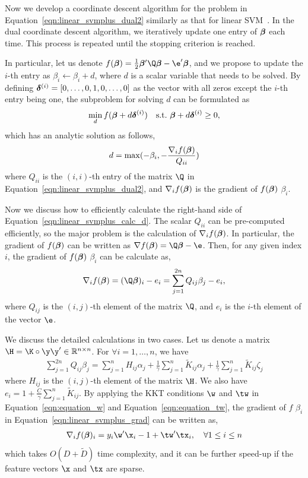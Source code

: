 Now we develop a coordinate descent algorithm for the problem in Equation~\ref{eqn:linear_svmplus_dual2} similarly as that for linear SVM~\citep{DCD_linearsvm}. In the dual coordinate descent algorithm, we iteratively update one entry of $\bm{\beta}$ each time. This process is repeated until the stopping criterion is reached.

In particular, let us denote $f(\bb) = \frac{1}{2}\bb'\Q\bb -\e'\bb$, and we propose to update the $i$-th entry as $\beta_i\leftarrow \beta_i + d$, where $d$ is a scalar variable that needs to be solved. By defining $\bm{\delta}^{(i)} = [0, \ldots, 0, 1, 0, \ldots, 0]$ as the vector with all zeros except the $i$-th entry being one, the subproblem for solving $d$ can be formulated as
\begin{eqnarray}
\min_{d} f(\bm{\beta} + d\bm{\delta}^{(i)}) \quad \mbox{s.t.}\,\,\bm{\beta} +  d\bm{\delta}^{(i)} \geq 0,\label{eqn:linear_svmplus_sub}
\end{eqnarray}
which has an analytic solution as follows,
\begin{eqnarray}
d = \max(- \beta_i, - \frac{\nabla_i f(\bm{\beta})}{Q_{ii}}) \label{eqn:linear_svmplus_calc_d}
\end{eqnarray}
where $Q_{ii}$ is the $(i, i)$-th entry of the matrix $\Q$ in Equation~\ref{eqn:linear_svmplus_dual2}, and $\nabla_if(\bm{\beta})$ is the gradient of $f(\bm{\beta})$ \wrt $\beta_i$.

Now we discuss how to efficiently calculate the right-hand side of Equation~\ref{eqn:linear_svmplus_calc_d}. The scalar $Q_{ii}$ can be pre-computed efficiently, so the major problem is the calculation of $\nabla_i f(\bm{\beta})$. In particular, the gradient of $f(\bm{\beta})$ can be written as $\nabla f(\bb) = \Q\bb - \e$. Then, for any given index $i$, the gradient of $f(\bm{\beta})$ \wrt $\beta_i$ can be calculate as,
\begin{eqnarray}\label{eqn:linear_svmplus_grad}
\nabla_if(\bb) = (\Q\bb)_i - e_i = \sum_{j=1}^{2n}Q_{ij}\beta_j - e_i,
\end{eqnarray}
where $Q_{ij}$ is the $(i, j)$-th element of the matrix $\Q$, and $e_i$ is the $i$-th element of the vector $\e$.

We discuss the detailed calculations in two cases. Let us denote a matrix $\H = \K\circ\y\y' \in \bbR^{n\times n}$. For $\forall i = 1,\ldots, n$, we have
\begin{eqnarray}
\sum_{j=1}^{2n}Q_{ij}\beta_j = \sum_{j=1}^nH_{ij}\alpha_j + \frac{1}{\gamma}\sum_{j=1}^n\tilde{K}_{ij}\alpha_j + \frac{1}{\gamma}\sum_{j=1}^n\tilde{K}_{ij}\zeta_j\nonumber
\end{eqnarray}
where $H_{ij}$ is the $(i,j)$-th element of the matrix $\H$. We also have $e_i = 1 +\frac{C}{\gamma}\sum_{j=1}^n\tilde{K}_{ij}$. By applying the KKT conditions \wrt $\w$ and $\tw$ in Equation~\ref{eqn:equation_w} and Equation~\ref{eqn:equation_tw}, the gradient of $f$ \wrt $\beta_i$ in Equation~\ref{eqn:linear_svmplus_grad} can be written as,
\begin{eqnarray}\label{eqn:linear_svmplus_grad_01}
\nabla_if(\bb)_i = y_i\w'\x_i - 1  + \tw'\tx_i, \quad \forall 1\leq i \leq n
\end{eqnarray}
which takes $O(D+\tilde{D})$ time complexity, and it can be further speed-up if the feature vectors $\x$ and $\tx$ are sparse.

